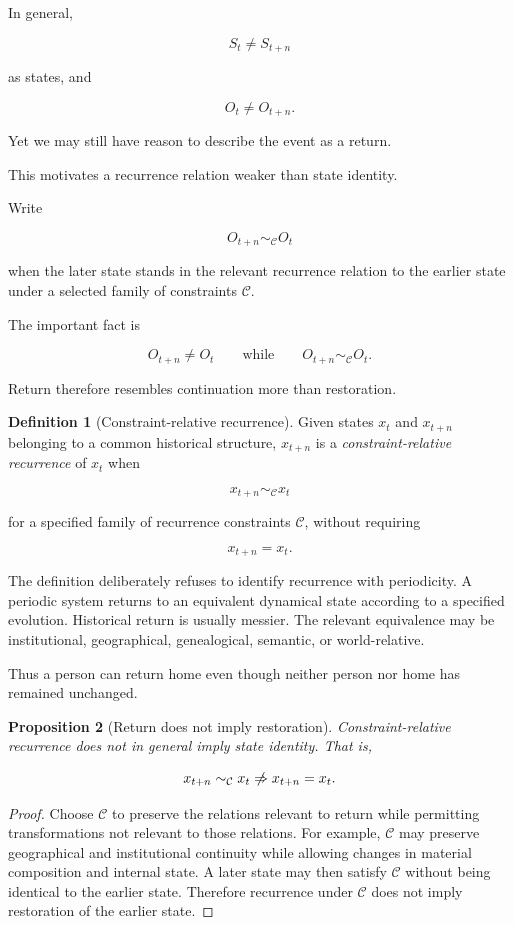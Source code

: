 \documentclass[
  11pt,
  a4paper,
  DIV=12,
  BCOR=0mm,
  parskip=half-
]{scrartcl}
\newcommand{\simconstraint}{\sim_{\mathcal C}}
\newcommand{\nimplies}{%
  \centernot\Rightarrow
}
\theoremstyle{definition}
\newtheorem{definition}{Definition}[section]
\theoremstyle{plain}
\newtheorem{proposition}[definition]{Proposition}
\theoremstyle{remark}
\begin{document}
In general,

\[
  S_t\neq S_{t+n}
\]

as states, and

\[
  O_t\neq O_{t+n}.
\]

Yet we may still have reason to describe the event as a return.

This motivates a recurrence relation weaker than state identity.

Write

\[
  O_{t+n}\simconstraint O_t
\]

when the later state stands in the relevant recurrence relation to the earlier
state under a selected family of constraints \(\mathcal C\).

The important fact is

\[
  O_{t+n}\neq O_t
  \qquad\text{while}\qquad
  O_{t+n}\simconstraint O_t.
\]

Return therefore resembles continuation more than restoration.

\begin{definition}[Constraint-relative recurrence]
\label{def:constraint-recurrence}
Given states \(x_t\) and \(x_{t+n}\) belonging to a common historical
structure, \(x_{t+n}\) is a \emph{constraint-relative recurrence} of \(x_t\)
when

\[
  x_{t+n}\sim_{\mathcal C}x_t
\]

for a specified family of recurrence constraints \(\mathcal C\), without
requiring

\[
  x_{t+n}=x_t.
\]
\end{definition}

The definition deliberately refuses to identify recurrence with periodicity.
A periodic system returns to an equivalent dynamical state according to a
specified evolution. Historical return is usually messier. The relevant
equivalence may be institutional, geographical, genealogical, semantic, or
world-relative.

Thus a person can return home even though neither person nor home has remained
unchanged.

\begin{proposition}[Return does not imply restoration]
\label{prop:return-not-restoration}
Constraint-relative recurrence does not in general imply state identity.
That is,

\[
  x_{t+n}\sim_{\mathcal C}x_t
  \nimplies
  x_{t+n}=x_t.
\]
\end{proposition}

\begin{proof}
Choose \(\mathcal C\) to preserve the relations relevant to return while
permitting transformations not relevant to those relations. For example,
\(\mathcal C\) may preserve geographical and institutional continuity while
allowing changes in material composition and internal state. A later state
may then satisfy \(\mathcal C\) without being identical to the earlier state.
Therefore recurrence under \(\mathcal C\) does not imply restoration of the
earlier state.
\end{proof}
\end{document}
